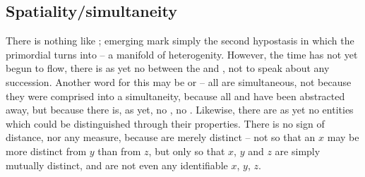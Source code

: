 \subsection{Spatiality/simultaneity}\label{sub:spatialityBeforeTemporality}
\pa\label{pa:spatialityBeforeTemporality} There is nothing like ; emerging  mark simply the second
hypostasis in which the primordial  turns into  -- a
manifold of heterogenity. However, the time has not yet begun to flow, there is
as yet no  between the  and , not to
speak about any succession. Another word for this may be  or
 -- all  are simultaneous, not because they
were comprised into a simultaneity, because all  and  have
been abstracted away, but because there is, as yet, no , no
.  Likewise, there are as yet no entities which could be
distinguished through their properties.    There is no sign of distance, nor
any measure, because  are merely distinct -- not so that an $x$
may be more distinct from $y$ than from $z$, but only so that $x$, $y$ and $z$
are simply mutually distinct, and are not even any identifiable $x$, $y$, $z$.


